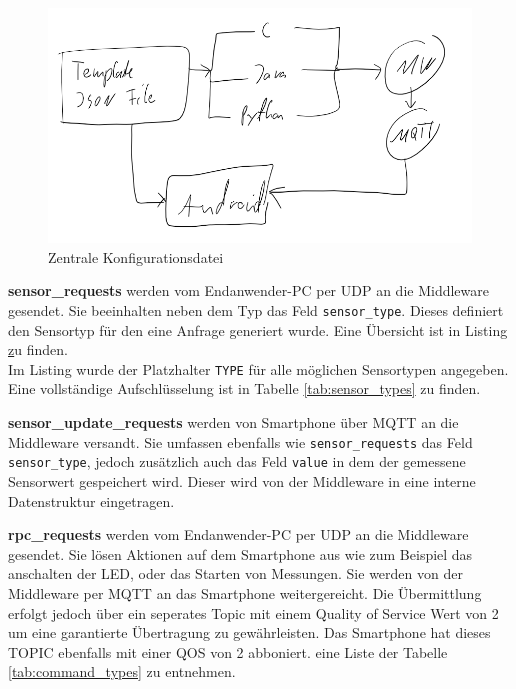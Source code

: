 \documentclass[11pt,a4paper]{report}
\begin{document}
\begin{figure}[htbp]
  \centering
  \includegraphics[width=.9\textwidth]{images/all_json.png}
  \caption{Zentrale Konfigurationsdatei}
  \label{fig:all_json}
\end{figure}


\textbf{sensor\_requests} werden vom Endanwender-PC per UDP an die Middleware gesendet.
Sie beeinhalten neben dem Typ das Feld \texttt{sensor\_type}.
Dieses definiert den Sensortyp für den eine Anfrage generiert wurde.
Eine Übersicht ist in Listing \href{lst:sensor_request} zu finden.
\\
Im Listing wurde der Platzhalter \texttt{TYPE} für alle möglichen Sensortypen angegeben.
Eine vollständige Aufschlüsselung ist in Tabelle \ref{tab:sensor_types} zu finden.


\textbf{sensor\_update\_requests} werden von Smartphone über MQTT an die Middleware versandt.
Sie umfassen ebenfalls wie \texttt{sensor\_requests} das Feld \texttt{sensor\_type}, jedoch zusätzlich auch das Feld \texttt{value} in dem der gemessene Sensorwert gespeichert wird.
Dieser wird von der Middleware in eine interne Datenstruktur eingetragen.

\textbf{rpc\_requests} werden vom Endanwender-PC per UDP an die Middleware gesendet.
Sie lösen Aktionen auf dem Smartphone aus wie zum Beispiel das anschalten der LED, oder das Starten von Messungen.
Sie werden von der Middleware per MQTT an das Smartphone weitergereicht.
Die Übermittlung erfolgt jedoch über ein seperates Topic mit einem Quality of Service Wert von 2 um eine garantierte Übertragung zu gewährleisten.
Das Smartphone hat dieses TOPIC ebenfalls mit einer QOS von 2 abboniert.
eine Liste der Tabelle \ref{tab:command_types} zu entnehmen.
\end{document}
